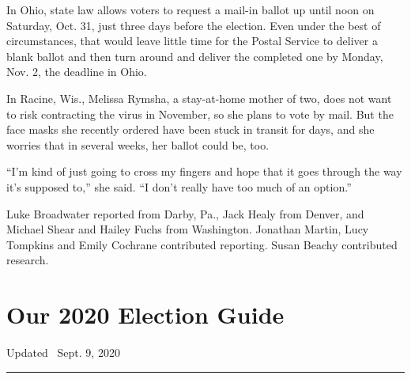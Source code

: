 In Ohio, state law allows voters to request a mail-in ballot up until
noon on Saturday, Oct. 31, just three days before the election. Even
under the best of circumstances, that would leave little time for the
Postal Service to deliver a blank ballot and then turn around and
deliver the completed one by Monday, Nov. 2, the deadline in Ohio.

In Racine, Wis., Melissa Rymsha, a stay-at-home mother of two, does not
want to risk contracting the virus in November, so she plans to vote by
mail. But the face masks she recently ordered have been stuck in transit
for days, and she worries that in several weeks, her ballot could be,
too.

``I'm kind of just going to cross my fingers and hope that it goes
through the way it's supposed to,'' she said. ``I don't really have too
much of an option.''

Luke Broadwater reported from Darby, Pa., Jack Healy from Denver, and
Michael Shear and Hailey Fuchs from Washington. Jonathan Martin, Lucy
Tompkins and Emily Cochrane contributed reporting. Susan Beachy
contributed research.

\hypertarget{our-2020-election-guide}{%
\section{Our 2020 Election Guide}\label{our-2020-election-guide}}

Updated ~Sept. 9, 2020

\begin{center}\rule{0.5\linewidth}{\linethickness}\end{center}

